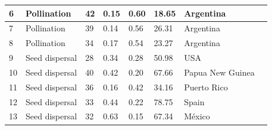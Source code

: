 \documentclass[a4paper, 12pt]{article}
\begin{document}
\begin{table}[H]
\begin{adjustbox}{width=\columnwidth,center}
{\begin{tabular}{|l|l|l|l|l|l|l|l|}
6                                  & Pollination                        & 42                              & 0.15                            & 0.60                            & 18.65                              & Argentina                              & \textcite{valientebanuet_beyond_2015}                      \\ \hline
7                                  & Pollination                        & 39                              & 0.14                            & 0.56                            & 26.31                              & Argentina                              & \textcite{valientebanuet_beyond_2015}                       \\ \hline
8                                  & Pollination                        & 34                              & 0.17                            & 0.54                            & 23.27                              & Argentina                              & \textcite{valientebanuet_beyond_2015}                       \\ \hline
9                                  & Seed dispersal                     & 28                              & 0.34                            & 0.28                            & 50.98                              & USA                                    & \textcite{baird_selection_1980}                                      \\ \hline
10                                 & Seed dispersal                     & 40                              & 0.42                            & 0.20                            & 67.66                              & Papua New Guinea                       & \cite{beehler_frugivory_1983}                                    \\ \hline
11                                 & Seed dispersal                     & 36                              & 0.16                            & 0.42                            & 34.16                              & Puerto Rico                            & \textcite{carlo_avian_2003}                               \\ \hline
12                                 & Seed dispersal                     & 33                              & 0.44                            & 0.22                            & 78.75                              & Spain                                  & \textcite{jordano_ciclo_1985}                                    \\ \hline
13                                 & Seed dispersal                     & 32                              & 0.63                            & 0.15                            & 67.34                              & México                                 & \textcite{kantak_observations_1979}                                     \\ \hline

\end{tabular}}
\end{adjustbox}
\end{table}
\end{document}
